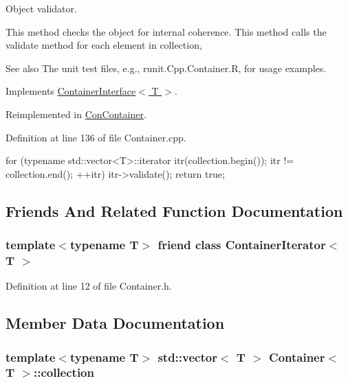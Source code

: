 Object validator. 

This method checks the object for internal coherence. This method calls the validate method for each element in collection, \begin{DoxySeeAlso}{See also}
The unit test files, e.g., runit.Cpp.Container.R, for usage examples. 
\end{DoxySeeAlso}


Implements \hyperlink{class_container_interface_a550edb62b31da71cd66270d87bc81c97}{ContainerInterface$<$ T $>$}.



Reimplemented in \hyperlink{class_con_container_aac12a3d3604db9ff715503816109470c}{ConContainer}.



Definition at line 136 of file Container.cpp.


\begin{DoxyCode}
  {
    for (typename std::vector<T>::iterator itr(collection.begin()); itr
        != collection.end(); ++itr)
      {
        itr->validate();
      }
    return true;
  }
\end{DoxyCode}


\subsection{Friends And Related Function Documentation}
\hypertarget{class_container_aa4ab453faa4914282441502e99a0afb1}{
\subsubsection[{ContainerIterator$<$ T $>$}]{\setlength{\rightskip}{0pt plus 5cm}template$<$typename T$>$ friend class {\bf ContainerIterator}$<$ T $>$}}
\label{class_container_aa4ab453faa4914282441502e99a0afb1}


Definition at line 12 of file Container.h.



\subsection{Member Data Documentation}
\hypertarget{class_container_a67d3456948d7bb2e905f64f75a52d5a9}{
\subsubsection[{collection}]{\setlength{\rightskip}{0pt plus 5cm}template$<$typename T$>$ std::vector$<$ T $>$ {\bf Container}$<$ T $>$::{\bf collection}}}
\label{class_container_a67d3456948d7bb2e905f64f75a52d5a9}


